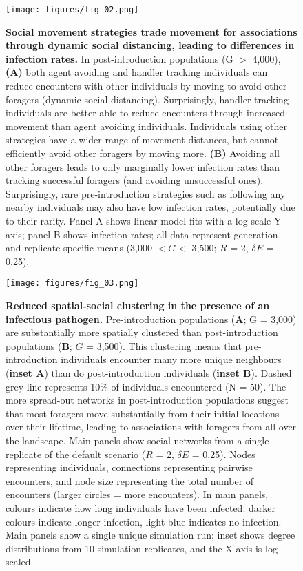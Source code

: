 \begin{figure}%
    \centering
    \texttt{[image: figures/fig\_02.png]}
    \caption{
        \textbf{Social movement strategies trade movement for associations through dynamic social distancing, leading to differences in infection rates.}
        In post-introduction populations (G $>$ 4,000), \textbf{(A)} both agent avoiding and handler tracking individuals can reduce encounters with other individuals by moving to avoid other foragers (dynamic social distancing).
        Surprisingly, handler tracking individuals are better able to reduce encounters through increased movement than agent avoiding individuals.
        Individuals using other strategies have a wider range of movement distances, but cannot efficiently avoid other foragers by moving more.
        \textbf{(B)} Avoiding all other foragers leads to only marginally lower infection rates than tracking successful foragers (and avoiding unsuccessful ones).
        Surprisingly, rare pre-introduction strategies such as following any nearby individuals may also have low infection rates, potentially due to their rarity.
        Panel A shows linear model fits with a log scale Y-axis; panel B shows infection rates; all data represent generation- and replicate-specific means (3,000 $< G <$ 3,500; $R$ = 2, $\delta E$ = 0.25).
    }\label{fig2}
\end{figure}

\begin{figure*}
    \centering
    \texttt{[image: figures/fig\_03.png]}
    \caption{
        \textbf{Reduced spatial-social clustering in the presence of an infectious pathogen.}
        Pre-introduction populations (\textbf{A}; G = 3,000) are substantially more spatially clustered than post-introduction populations (\textbf{B}; $G$ = 3,500).
        This clustering means that pre-introduction individuals encounter many more unique neighbours (\textbf{inset A}) than do post-introduction individuals (\textbf{inset B}).
        Dashed grey line represents 10\% of individuals encountered (N = 50).
        The more spread-out networks in post-introduction populations suggest that most foragers move substantially from their initial locations over their lifetime, leading to associations with foragers from all over the landscape.
        Main panels show social networks from a single replicate of the default scenario ($R$ = 2, $\delta E$ = 0.25).
        Nodes representing individuals, connections representing pairwise encounters, and node size representing the total number of encounters (larger circles = more encounters).
        In main panels, colours indicate how long individuals have been infected: darker colours indicate longer infection, light blue indicates no infection.
        Main panels show a single unique simulation run; inset shows degree distributions from 10 simulation replicates, and the X-axis is log-scaled.
    }\label{fig3}
\end{figure*}

